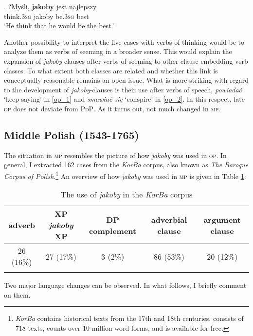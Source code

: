 \documentclass[output=paper
,modfonts
,nonflat]{langsci/langscibook}
\newcommand{\glossformat}[1]{\textsc{#1}}
\newcommand{\thirdperson}{\glossformat{3}\xspace}
\newcommand{\sg}{\glossformat{sg}\xspace}
\begin{document}
\exg.		?Myśli, \textbf{jakoby} jest najlepszy. \label{portugal} \\
		think.{\thirdperson}{\sg} jakoby be.{\thirdperson}{\sg} best \\
		 `He think that he would be the best.'

Another possibility to interpret the five cases with verbs of thinking would be to analyze them as verbs of seeming in a broader sense. This would explain the expansion of \emph{jakoby}-clauses after verbs of seeming to other clause-embedding verb classes. To what extent both classes are related and whether this link is conceptually reasonable remains an open issue. What is more striking with regard to the development of \emph{jakoby}-clauses is their use after verbs of speech, \emph{powiadać} `keep saying' in \ref{op_1} and \emph{smawiać się} `conspire' in \ref{op_2}. In this respect, late \textsc{op} does not deviate from \textsc{PdP}. As it turns out, not much changed in \textsc{mp}.        

\subsection{Middle Polish (1543-1765)}

The situation in \textsc{mp} resembles the picture of how \emph{jakoby} was used in \textsc{op}. In general, I extracted 162 cases from the \emph{KorBa} corpus, also known as \emph{The Baroque Corpus of Polish}.\footnote{\emph{KorBa} contains historical texts from the 17th and 18th centuries, consists of 718 texts, counts over 10 million word forms, and is available for free. 
}    
An overview of how \emph{jakoby} was used in \textsc{mp} is given in Table \ref{mlodopolski_statystka}:

\begin{table}[h] \center \begin{tabular}{ccccc} 
\lsptoprule
adverb & XP \emph{jakoby} XP & DP complement  & \newline adverbial clause & argument clause \\
\midrule
 26 (16\%) & 27 (17\%) & 3 (2\%) & 86 (53\%) & 20 (12\%)  \\
 \lspbottomrule
\end{tabular}
\caption{The use of \emph{jakoby} in the \emph{KorBa} corpus} \label{mlodopolski_statystka}
\end{table}

\noindent  Two major language changes can be observed. In what follows, I briefly comment on them. 
\end{document}
